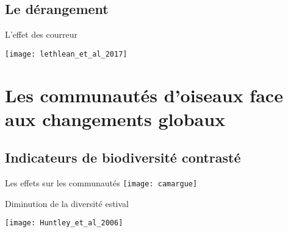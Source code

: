 \documentclass[10pt]{beamer}
\begin{document}
\subsection{Le dérangement}

\begin{frame}{L'effet des courreur}

       \begin{center}
     \texttt{[image: lethlean\_et\_al\_2017]}
   
      \end{center}
       \begin{tiny}
      \vspace{10pt}
        \cite{Lethlean2017}

  \end{tiny}
 \end{frame}

 \section[Les effets sur les communautés]{Les communautés d'oiseaux face aux changements globaux}


\subsection{Indicateurs de biodiversité contrasté}

\begin{frame} {Les effets sur les communautés}
 \texttt{[image: camargue]}
\end{frame}


\begin{frame}{Diminution de la diversité estival}
  \begin{center}
   \texttt{[image: Huntley\_et\_al\_2006]}
  \end{center}
  \begin{tiny}
   \cite{Huntley2006}
  \end{tiny}

\end{frame}
\end{document}
